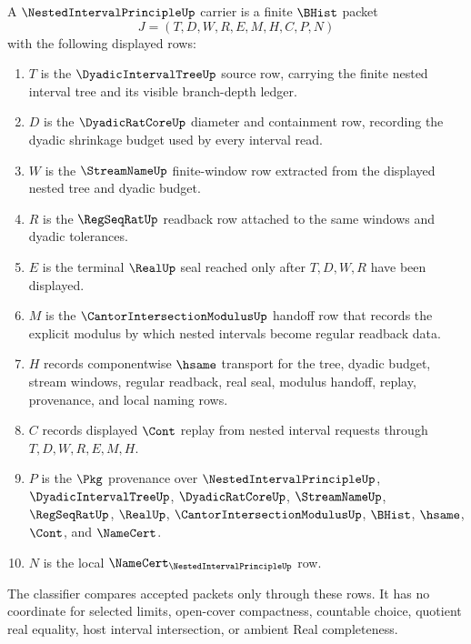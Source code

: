 \begin{definition}
\label{def:nested-interval-principle-carrier}
A $\NestedIntervalPrincipleUp$ carrier is a finite $\BHist$ packet
$$
J=(T,D,W,R,E,M,H,C,P,N)
$$
with the following displayed rows:
\begin{enumerate}
\item $T$ is the $\DyadicIntervalTreeUp$ source row, carrying the finite nested interval tree and its visible branch-depth ledger.
\item $D$ is the $\DyadicRatCoreUp$ diameter and containment row, recording the dyadic shrinkage budget used by every interval read.
\item $W$ is the $\StreamNameUp$ finite-window row extracted from the displayed nested tree and dyadic budget.
\item $R$ is the $\RegSeqRatUp$ readback row attached to the same windows and dyadic tolerances.
\item $E$ is the terminal $\RealUp$ seal reached only after $T,D,W,R$ have been displayed.
\item $M$ is the $\CantorIntersectionModulusUp$ handoff row that records the explicit modulus by which nested intervals become regular readback data.
\item $H$ records componentwise $\hsame$ transport for the tree, dyadic budget, stream windows, regular readback, real seal, modulus handoff, replay, provenance, and local naming rows.
\item $C$ records displayed $\Cont$ replay from nested interval requests through $T,D,W,R,E,M,H$.
\item $P$ is the $\Pkg$ provenance over $\NestedIntervalPrincipleUp$, $\DyadicIntervalTreeUp$, $\DyadicRatCoreUp$, $\StreamNameUp$, $\RegSeqRatUp$, $\RealUp$, $\CantorIntersectionModulusUp$, $\BHist$, $\hsame$, $\Cont$, and $\NameCert$.
\item $N$ is the local $\NameCert_{\NestedIntervalPrincipleUp}$ row.
\end{enumerate}
The classifier compares accepted packets only through these rows. It has no coordinate for selected limits, open-cover compactness, countable choice, quotient real equality, host interval intersection, or ambient Real completeness.
\end{definition}

